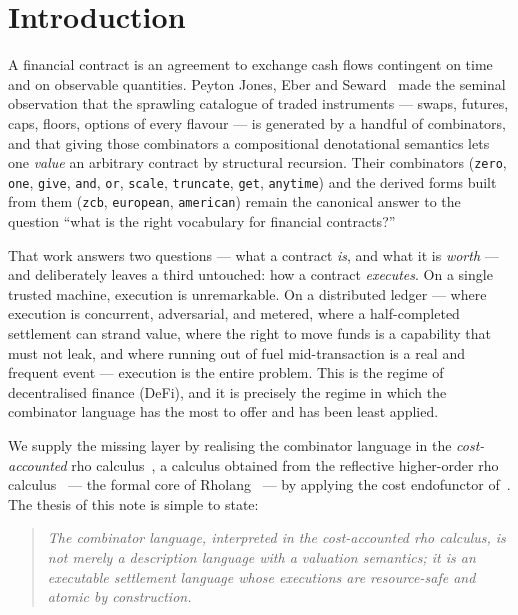\documentclass[11pt]{article}
\theoremstyle{definition}
\theoremstyle{plain}
\newcommand{\rcalc}{rho calculus}
\begin{document}
\tableofcontents

\section{Introduction}

A financial contract is an agreement to exchange cash flows contingent on time and on observable
quantities. Peyton Jones, Eber and Seward~\cite{SPJ2000} made the seminal observation that the
sprawling catalogue of traded instruments --- swaps, futures, caps, floors, options of every
flavour --- is generated by a handful of combinators, and that giving those combinators a
compositional denotational semantics lets one \emph{value} an arbitrary contract by structural
recursion. Their combinators (\texttt{zero}, \texttt{one}, \texttt{give}, \texttt{and}, \texttt{or},
\texttt{scale}, \texttt{truncate}, \texttt{get}, \texttt{anytime}) and the derived forms built from
them (\texttt{zcb}, \texttt{european}, \texttt{american}) remain the canonical answer to the question
``what is the right vocabulary for financial contracts?''

That work answers two questions --- what a contract \emph{is}, and what it is \emph{worth} --- and
deliberately leaves a third untouched: how a contract \emph{executes}. On a single trusted machine,
execution is unremarkable. On a distributed ledger --- where execution is concurrent, adversarial,
and metered, where a half-completed settlement can strand value, where the right to move funds is a
capability that must not leak, and where running out of fuel mid-transaction is a real and frequent
event --- execution is the entire problem. This is the regime of decentralised finance (DeFi), and
it is precisely the regime in which the combinator language has the most to offer and has been least
applied.

We supply the missing layer by realising the combinator language in the \emph{cost-accounted}
\rcalc~\cite{CAR2026}, a calculus obtained from the reflective higher-order \rcalc~\cite{MeredithRadestock2005a}
--- the formal core of Rholang~\cite{Rholang} --- by applying the cost endofunctor of~\cite{CGC2026}.
The thesis of this note is simple to state:

\begin{quote}
\emph{The combinator language, interpreted in the cost-accounted \rcalc, is not merely a description
language with a valuation semantics; it is an executable settlement language whose executions are
resource-safe and atomic by construction.}
\end{quote}
\end{document}

